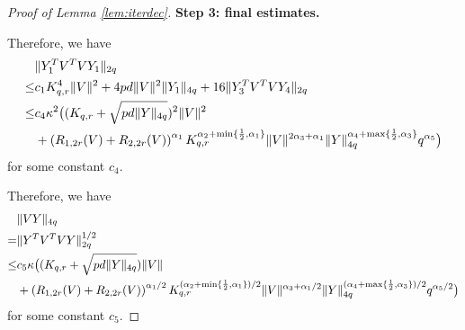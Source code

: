 \documentclass[10pt,a4paper]{amsart}
\DeclarePairedDelimiter{\norm}{\lVert}{\rVert}
\begin{document}
\begin{proof}[Proof of Lemma \ref{lem:iterdec}]
\textbf{Step 3: final estimates.}

Therefore, we have
\begin{align*}
    &\norm{Y_1^TV^TVY_1}_{2q}  \\\le & c_1 K_{q,r}^4 \norm{V}^2 + 4pd\norm{V}^2 \norm{Y_1}_{4q}+ 16 \norm{Y_3^TV^TVY_4}_{2q}
    \\ \le & c_4 \kappa^2 \big((K_{q,r}+\sqrt{pd\norm{Y}_{4q}})^2 \norm{V}^2 \\&+ \left(R_{1,2r}(V)+R_{2,2r}(V)\right)^{\alpha_1}K_{q,r}^{\alpha_2+\min\{\frac{1}{2},\alpha_1\}}\norm{V}^{2\alpha_3+\alpha_1} \norm{Y}_{4q}^{\alpha_4+\max\{\frac{1}{2},\alpha_3\}}q^{\alpha_5} \big)
\end{align*}
for some constant $c_4$.

Therefore, we have
\begin{align*}
    &\norm{VY}_{4q}
\\=&\norm{Y^TV^TVY}_{2q}^{1/2}
 \\ \le & c_5 \kappa \big((K_{q,r}+\sqrt{pd\norm{Y}_{4q}}) \norm{V} \\&+ \left(R_{1,2r}(V)+R_{2,2r}(V)\right)^{\alpha_1/2}K_{q,r}^{(\alpha_2+\min\{\frac{1}{2},\alpha_1\})/2}\norm{V}^{\alpha_3+\alpha_1/2} \norm{Y}_{4q}^{(\alpha_4+\max\{\frac{1}{2},\alpha_3\})/2}q^{\alpha_5/2} \big)
\end{align*}
for some constant $c_5$.






\end{proof}
\end{document}
